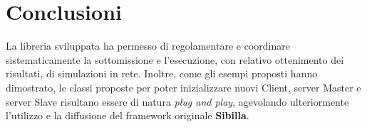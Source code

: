 \chapter{Conclusioni}
La libreria sviluppata ha permesso di regolamentare e coordinare sistematicamente la sottomissione e l'esecuzione, con relativo ottenimento dei risultati, di simulazioni in rete.
Inoltre, come gli esempi proposti hanno dimostrato, le classi proposte per poter inizializzare nuovi Client, server Master e server Slave risultano essere di natura \textit{plug and play}, agevolando ulteriormente l'utilizzo e la diffusione del framework originale \textbf{Sibilla}.


